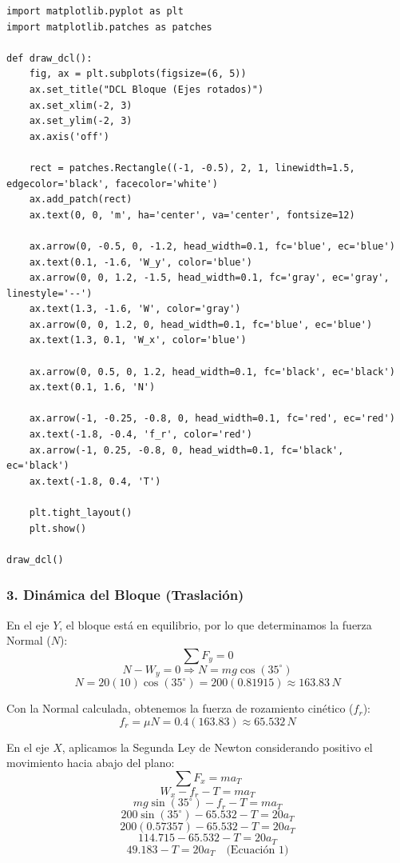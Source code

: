 \documentclass[12pt, a4paper]{article}
\begin{document}
\begin{lstlisting}
import matplotlib.pyplot as plt
import matplotlib.patches as patches

def draw_dcl():
    fig, ax = plt.subplots(figsize=(6, 5))
    ax.set_title("DCL Bloque (Ejes rotados)")
    ax.set_xlim(-2, 3)
    ax.set_ylim(-2, 3)
    ax.axis('off')
    
    rect = patches.Rectangle((-1, -0.5), 2, 1, linewidth=1.5, edgecolor='black', facecolor='white')
    ax.add_patch(rect)
    ax.text(0, 0, 'm', ha='center', va='center', fontsize=12)
    
    ax.arrow(0, -0.5, 0, -1.2, head_width=0.1, fc='blue', ec='blue')
    ax.text(0.1, -1.6, 'W_y', color='blue')
    ax.arrow(0, 0, 1.2, -1.5, head_width=0.1, fc='gray', ec='gray', linestyle='--')
    ax.text(1.3, -1.6, 'W', color='gray')
    ax.arrow(0, 0, 1.2, 0, head_width=0.1, fc='blue', ec='blue')
    ax.text(1.3, 0.1, 'W_x', color='blue')
    
    ax.arrow(0, 0.5, 0, 1.2, head_width=0.1, fc='black', ec='black')
    ax.text(0.1, 1.6, 'N')
    
    ax.arrow(-1, -0.25, -0.8, 0, head_width=0.1, fc='red', ec='red')
    ax.text(-1.8, -0.4, 'f_r', color='red')
    ax.arrow(-1, 0.25, -0.8, 0, head_width=0.1, fc='black', ec='black')
    ax.text(-1.8, 0.4, 'T')
    
    plt.tight_layout()
    plt.show()

draw_dcl()
\end{lstlisting}

\subsubsection*{3. Dinámica del Bloque (Traslación)}
En el eje $Y$, el bloque está en equilibrio, por lo que determinamos la fuerza Normal ($N$):
$$\sum F_y = 0$$
$$N - W_y = 0 \Rightarrow N = mg \cos(35^\circ)$$
$$N = 20(10) \cos(35^\circ) = 200(0.81915) \approx 163.83 \, \si{N}$$

Con la Normal calculada, obtenemos la fuerza de rozamiento cinético ($f_r$):
$$f_r = \mu N = 0.4 (163.83) \approx 65.532 \, \si{N}$$

En el eje $X$, aplicamos la Segunda Ley de Newton considerando positivo el movimiento hacia abajo del plano:
$$\sum F_x = m a_T$$
$$W_x - f_r - T = m a_T$$
$$mg \sin(35^\circ) - f_r - T = m a_T$$
$$200 \sin(35^\circ) - 65.532 - T = 20 a_T$$
$$200 (0.57357) - 65.532 - T = 20 a_T$$
$$114.715 - 65.532 - T = 20 a_T$$
$$49.183 - T = 20 a_T \quad \text{(Ecuación 1)}$$
\end{document}
